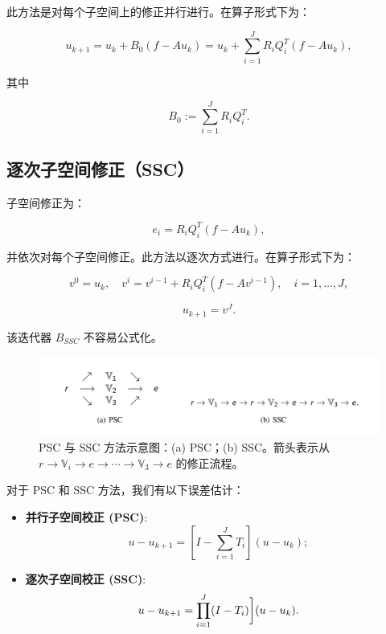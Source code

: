 \documentclass[letterpaper,12pt]{article}
\begin{document}
此方法是对每个子空间上的修正并行进行。在算子形式下为：

\begin{equation}
u_{k+1} = u_k + B_0 (f - A u_k) = u_k + \sum_{i=1}^J R_i Q_i^T (f - A u_k),
\end{equation}

其中

\[
B_0 := \sum_{i=1}^J R_i Q_i^T.
\]

\subsection{逐次子空间修正（SSC）}

子空间修正为：

\[
e_i = R_i Q_i^T (f - A u_k),
\]

并依次对每个子空间修正。此方法以逐次方式进行。在算子形式下为：

\begin{equation}
v^0 = u_k, \quad v^i = v^{i-1} + R_i Q_i^T (f - A v^{i-1}), \quad i = 1, \dots, J,
\end{equation}

\begin{equation}
u_{k+1} = v^J.
\end{equation}

该迭代器 $B_{SSC}$ 不容易公式化。

\begin{figure}[htbp]
    \centering
    \includegraphics[width=1.0\textwidth]{./figure/psc_and_ssc.png}
    \caption{PSC 与 SSC 方法示意图：(a) PSC；(b) SSC。箭头表示从 $r \to \mathbb{V}_i \to e \to \cdots \to \mathbb{V}_3 \to e$ 的修正流程。}
\end{figure}

对于 PSC 和 SSC 方法，我们有以下误差估计：

\begin{itemize}
    \item \textbf{并行子空间校正 (PSC)}: \[ u-u_{k+1}=\left[I-\sum_{i=1}^{J}T_{i}\right](u-u_{k}); \]
    
    \item \textbf{逐次子空间校正 (SSC)}: \[ u-u_{k+1}=\prod_{i=1}^{J}(I-T_{i})\bigg{]}(u-u_{k}). \]
\end{itemize}
\end{document}
